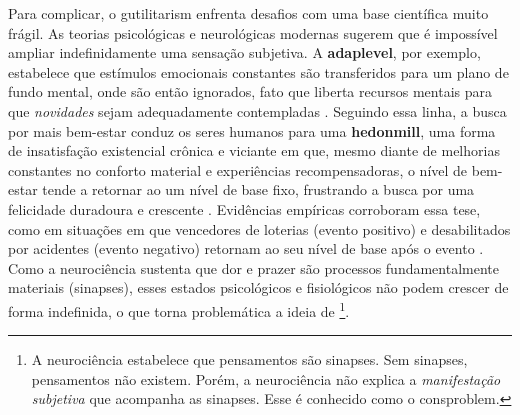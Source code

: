\documentclass[./main.tex]{subfiles}
\begin{document}
\par Para complicar, o \gls{gutilitarism} enfrenta desafios com uma base científica muito frágil. As teorias psicológicas e neurológicas modernas sugerem que é impossível ampliar indefinidamente uma sensação subjetiva. A \textbf{\gls{adaplevel}}, por exemplo, estabelece que estímulos emocionais constantes são transferidos para um plano de fundo mental, onde são então ignorados, fato que liberta recursos mentais para que \textit{novidades} sejam adequadamente contempladas \cite{Edwards_2018}. Seguindo essa linha, a busca por mais bem-estar conduz os seres humanos para uma \textbf{\gls{hedonmill}}, uma forma de insatisfação existencial crônica e viciante em que, mesmo diante de melhorias constantes no conforto material e experiências recompensadoras, o nível de bem-estar tende a retornar ao um nível de base fixo, frustrando a busca por uma felicidade duradoura e crescente \cite{Diener2009}. Evidências empíricas corroboram essa tese, como em situações em que vencedores de loterias (evento positivo) e desabilitados por acidentes (evento negativo) retornam ao seu nível de base após o evento \cite{Brickman_1978}. Como a neurociência sustenta que dor e prazer são processos fundamentalmente materiais (sinapses), esses estados psicológicos e fisiológicos não podem crescer de forma indefinida, o que torna problemática a ideia de \footnote{A neurociência estabelece que pensamentos são sinapses. Sem sinapses, pensamentos não existem. Porém, a neurociência não explica a \textit{manifestação subjetiva} que acompanha as sinapses. Esse é conhecido como o \gls{consproblem}.}.
\end{document}
